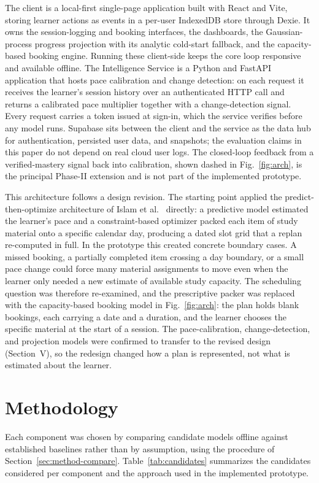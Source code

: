 \documentclass[conference]{IEEEtran}
\begin{document}
The client is a local-first single-page application built with React and Vite, storing learner actions as events in a per-user IndexedDB store through Dexie. It owns the session-logging and booking interfaces, the dashboards, the Gaussian-process progress projection with its analytic cold-start fallback, and the capacity-based booking engine. Running these client-side keeps the core loop responsive and available offline. The Intelligence Service is a Python and FastAPI application that hosts pace calibration and change detection: on each request it receives the learner's session history over an authenticated HTTP call and returns a calibrated pace multiplier together with a change-detection signal. Every request carries a token issued at sign-in, which the service verifies before any model runs. Supabase sits between the client and the service as the data hub for authentication, persisted user data, and snapshots; the evaluation claims in this paper do not depend on real cloud user logs. The closed-loop feedback from a verified-mastery signal back into calibration, shown dashed in Fig.~\ref{fig:arch}, is the principal Phase-II extension and is not part of the implemented prototype.

This architecture follows a design revision. The starting point applied the predict-then-optimize architecture of Islam et al.~\cite{islam2024} directly: a predictive model estimated the learner's pace and a constraint-based optimizer packed each item of study material onto a specific calendar day, producing a dated slot grid that a replan re-computed in full. In the prototype this created concrete boundary cases. A missed booking, a partially completed item crossing a day boundary, or a small pace change could force many material assignments to move even when the learner only needed a new estimate of available study capacity. The scheduling question was therefore re-examined, and the prescriptive packer was replaced with the capacity-based booking model in Fig.~\ref{fig:arch}: the plan holds blank bookings, each carrying a date and a duration, and the learner chooses the specific material at the start of a session. The pace-calibration, change-detection, and projection models were confirmed to transfer to the revised design (Section~V), so the redesign changed how a plan is represented, not what is estimated about the learner.

\section{Methodology}
Each component was chosen by comparing candidate models offline against established baselines rather than by assumption, using the procedure of Section~\ref{sec:method-compare}. Table~\ref{tab:candidates} summarizes the candidates considered per component and the approach used in the implemented prototype.
\end{document}
